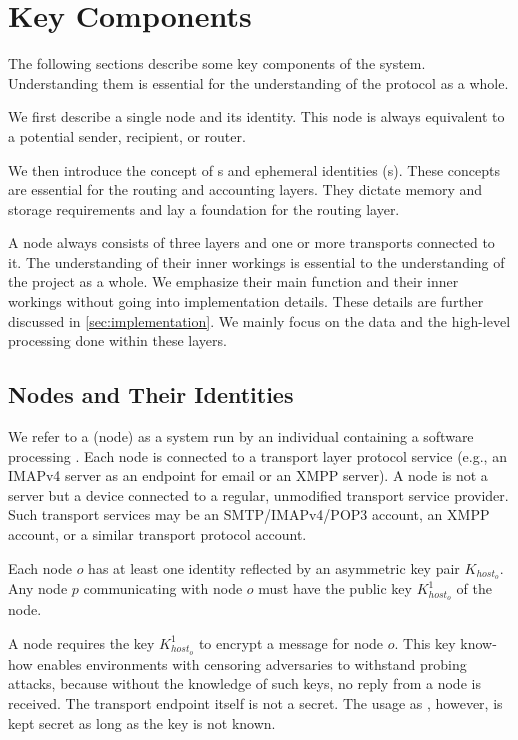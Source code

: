 \section{Key Components}
The following sections describe some key components of the system. Understanding them is essential for the understanding of the protocol as a whole. 

We first describe a single node and its identity. This node is always equivalent to a potential sender, recipient, or router. 

We then introduce the concept of s and ephemeral identities (s). These concepts are essential for the routing and accounting layers. They dictate memory and storage requirements and lay a foundation for the routing layer.

A node always consists of three layers and one or more transports connected to it. The understanding of their inner workings is essential to the understanding of the project as a whole. %
 We emphasize their main function and their inner workings without going into implementation details. These details are further discussed in \cref{sec:implementation}. We mainly focus on the data and the high-level processing done within these layers.

\subsection{Nodes and Their Identities}
We refer to a \VortexNode{} (node) as a system run by an individual containing a software processing \VortexMessages. Each node is connected to a transport layer protocol service (e.g., an IMAPv4 server as an endpoint for email or an XMPP server). A node is not a server but a device connected to a regular, unmodified transport service provider. Such transport services may be an SMTP/IMAPv4/POP3 account, an XMPP account, or a similar transport protocol account.

Each node $o$ has at least one identity reflected by an asymmetric key pair $K_{host_o}$. Any node $p$ communicating with node $o$ must have the public key  $K^1_{host_o}$ of the node.

A node requires the key $K^1_{host_o}$ to encrypt a message for node $o$. This key know-how enables environments with censoring adversaries to withstand probing attacks, because without the knowledge of such keys, no reply from a node is received. The transport endpoint itself is not a secret. The usage as \VortexNode, however, is kept secret as long as the key is not known.

